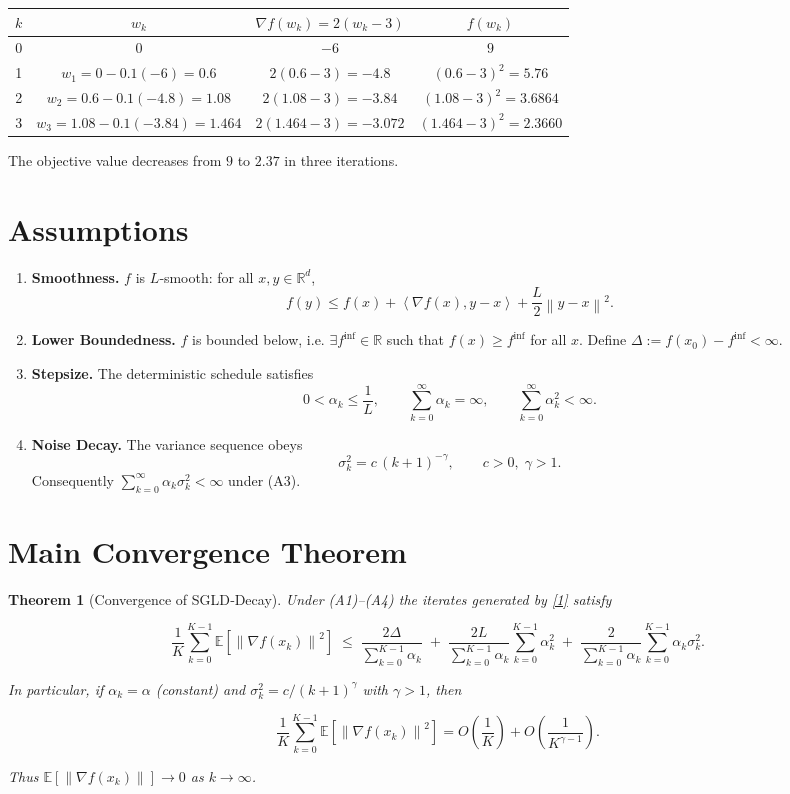\documentclass{article}
\newtheorem{theorem}{Theorem}
\newcommand{\E}{\mathbb{E}}
\newcommand{\R}{\mathbb{R}}
\newcommand{\norm}[1]{\left\|#1\right\|}
\newcommand{\ip}[2]{\left\langle #1,#2\right\rangle}
\begin{document}
\begin{center}
\begin{tabular}{c|c|c|c}
$k$ & $w_k$ & $\nabla f(w_k)=2(w_k-3)$ & $f(w_k)$\\ \hline
0 & $0$ & $-6$ & $9$\\
1 & $w_1=0-0.1(-6)=0.6$ & $2(0.6-3)=-4.8$ & $(0.6-3)^2=5.76$\\
2 & $w_2=0.6-0.1(-4.8)=1.08$ & $2(1.08-3)=-3.84$ & $(1.08-3)^2=3.6864$\\
3 & $w_3=1.08-0.1(-3.84)=1.464$ & $2(1.464-3)=-3.072$ & $(1.464-3)^2=2.3660$
\end{tabular}
\end{center}
The objective value decreases from $9$ to $2.37$ in three iterations.

\newpage
\section*{Assumptions}
\begin{enumerate}
\item \textbf{Smoothness.} $f$ is $L$‑smooth: for all $x,y\in\R^{d}$,
\[
f(y)\le f(x)+\ip{\nabla f(x)}{y-x}+\frac{L}{2}\norm{y-x}^{2}. \tag{A1}
\]

\item \textbf{Lower Boundedness.} $f$ is bounded below, i.e. $\exists f^{\inf}\in\R$ such that $f(x)\ge f^{\inf}$ for all $x$. Define $\Delta:=f(x_0)-f^{\inf}<\infty$. 

\item \textbf{Stepsize.} The deterministic schedule satisfies
\[
0<\alpha_k\le\frac{1}{L},\qquad \sum_{k=0}^{\infty}\alpha_k=\infty,\qquad \sum_{k=0}^{\infty}\alpha_k^{2}<\infty. \tag{A3}
\]

\item \textbf{Noise Decay.} The variance sequence obeys
\[
\sigma_k^{2}=c\,(k+1)^{-\gamma},\qquad c>0,\;\gamma>1. \tag{A4}
\]
Consequently $\sum_{k=0}^{\infty}\alpha_k\sigma_k^{2}<\infty$ under (A3). 
\end{enumerate}

\section*{Main Convergence Theorem}
\begin{theorem}[Convergence of SGLD‑Decay]\label{thm:main}
Under (A1)–(A4) the iterates generated by \eqref{1} satisfy  

\[
\frac{1}{K}\sum_{k=0}^{K-1}\E\!\left[\norm{\nabla f(x_k)}^{2}\right]\;
\le\;
\frac{2\Delta}{\sum_{k=0}^{K-1}\alpha_k}
\;+\;
\frac{2L}{\sum_{k=0}^{K-1}\alpha_k}\sum_{k=0}^{K-1}\alpha_k^{2}
\;+\;
\frac{2}{\sum_{k=0}^{K-1}\alpha_k}\sum_{k=0}^{K-1}\alpha_k\sigma_k^{2}.
\tag{2}
\]

In particular, if $\alpha_k=\alpha$ (constant) and $\sigma_k^{2}=c/(k+1)^{\gamma}$ with $\gamma>1$, then  

\[
\frac{1}{K}\sum_{k=0}^{K-1}\E\!\left[\norm{\nabla f(x_k)}^{2}\right]
=O\!\left(\frac{1}{K}\right)+O\!\left(\frac{1}{K^{\gamma-1}}\right).
\tag{3}
\]

Thus $\E[\norm{\nabla f(x_k)}]\to0$ as $k\to\infty$.
\end{theorem}
\end{document}
